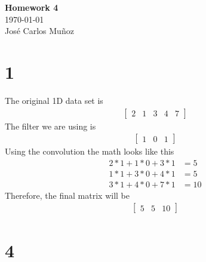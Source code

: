 \documentclass[12pt,english]{article}
\begin{document}
\begin{center}
    \Large
    \textbf{Homework 4}\\
    \small
    \today\\
    \large
    Jos\'{e} Carlos Mu\~{n}oz
\end{center}
\section*{1}
The original 1D data set is
\begin{align*}
\begin{bmatrix} 2 & 1 & 3 & 4 & 7\end{bmatrix}
\end{align*}
The filter we are using is
\begin{align*}
\begin{bmatrix} 1 & 0 & 1\end{bmatrix}
\end{align*}
Using the convolution the math looks like this
\begin{align*}
 2 * 1 + 1 * 0 + 3 * 1 & = 5\\
 1 * 1 + 3 * 0 + 4 * 1 & = 5\\
 3 * 1 + 4 * 0 + 7 * 1 & = 10
\end{align*}
Therefore, the final matrix will be
\begin{align*}
\begin{bmatrix} 5 & 5 & 10\end{bmatrix}
\end{align*}
\section*{4}
\end{document}

